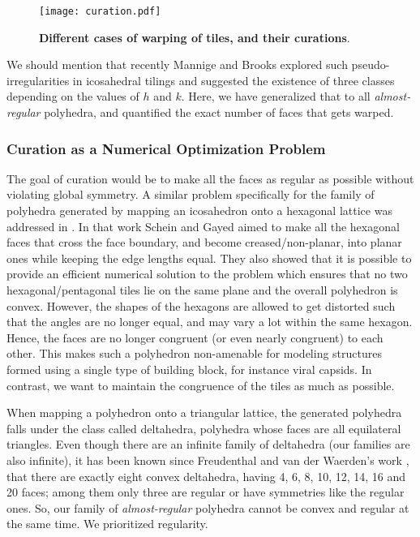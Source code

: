 \documentclass[11pt]{article}
\newcommand{\1}{\mathds{1}}
\begin{document}
\begin{figure}[h!]
\centering
\vspace{-0.6cm}
\texttt{[image: curation.pdf]}
\vspace{-0.3cm}
\caption[Different cases of warping of tiles, and their curations]{ \textbf{Different cases of warping of tiles, and their curations}.}   
\label{fig:assemblytheory:curation}
\vspace{-0.5cm}
\end{figure}

We should mention that recently Mannige and Brooks \cite{Mannige_Brooks_2010} explored such pseudo-irregularities in icosahedral tilings and suggested the existence of three classes depending on the values of $h$ and $k$. Here, we have generalized that to all \emph{almost-regular} polyhedra, and quantified the exact number of faces that gets warped. 


\subsubsection{Curation as a Numerical Optimization Problem}
The goal of curation would be to make all the faces as regular as possible without violating global symmetry. A similar problem specifically for the family of polyhedra generated by mapping an icosahedron onto a hexagonal lattice was addressed in \cite{Schein_Gayed_2014}. In that work Schein and Gayed aimed to make all the hexagonal faces that cross the face boundary, and become creased/non-planar, into planar ones while keeping the edge lengths equal. They also showed that it is possible to provide an efficient numerical solution to the problem which ensures that no two hexagonal/pentagonal tiles lie on the same plane and the overall polyhedron is convex. However, the shapes of the hexagons are allowed to get distorted such that the angles are no longer equal, and may vary a lot within the same hexagon. Hence, the faces are no longer congruent (or even nearly congruent) to each other. This makes such a polyhedron non-amenable for modeling structures formed using a single type of building block, for instance viral capsids. In contrast, we want to maintain the congruence of the tiles as much as possible. 

When mapping a polyhedron onto a triangular lattice, the generated polyhedra falls under the class called deltahedra, polyhedra whose faces are all equilateral triangles. Even though there are an infinite family of deltahedra \cite{Trigg_1978} (our families are also infinite), it has been known since Freudenthal and van der Waerden's work \cite{Freudenthal_1947}, that there are exactly eight convex deltahedra, having 4, 6, 8, 10, 12, 14, 16 and 20 faces; among them only three are regular or have symmetries like the regular ones. So, our family of \emph{almost-regular} polyhedra cannot be convex and regular at the same time. We prioritized regularity. 
\end{document}
